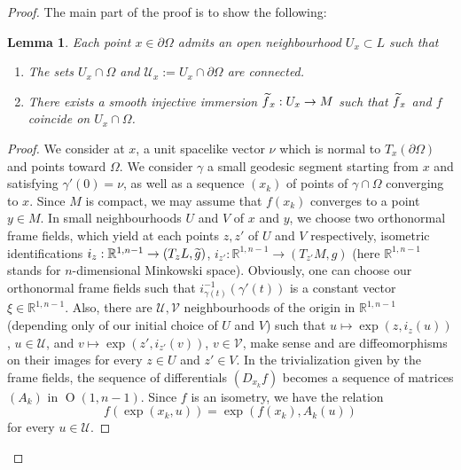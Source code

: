\documentclass[11pt]{article}
\newtheorem{lemm}[theo]{Lemma}
\theoremstyle{definition}
\numberwithin{equation}{section}
\numberwithin{figure}{section}
\numberwithin{table}{section}
\DeclareMathOperator{\Omp}{O}%
\newcommand*\RR{\mathbb{R}}
\let\oldtilde\tilde
\renewcommand*\tilde[1]{\mathchoice{\widetilde{#1}}{\widetilde{#1}}{\widetilde{#1}}{\oldtilde{#1}}}
\begin{document}
\begin{proof}
The main part of the proof is to show the following:

\begin{lemm}\label{lem.extension.locale}
Each point $x \in \partial \Omega$ admits an open neighbourhood $U_x \subset L$ such that
\begin{enumerate}
\item \label{5.9.1}The sets $U_x \cap \Omega$ and ${\mathcal U}_x:=U_x \cap \partial \Omega$ are connected.
\item \label{5.9.2}There exists a smooth injective immersion $\tilde{f}_x: U_x \to M$ such that $\tilde{f}_x$ and $f$ coincide on $U_x \cap \Omega$.
\end{enumerate}
\end{lemm}

\begin{proof}
We consider at $x$, a unit spacelike vector $\nu$ which is normal to $T_x(\partial \Omega)$ and points toward $\Omega$. We consider $\gamma$ a small geodesic segment starting from $x$ and satisfying $\gamma'(0)=\nu$, as well as a sequence $(x_k)$ of points of $\gamma \cap \Omega$ converging to $x$. Since $M$ is compact, we may assume that $f(x_k)$ converges to a point $y \in M$. In small neighbourhoods $U$ and $V$ of $x$ and $y$, we choose two orthonormal frame fields, which yield at each points $z,z'$ of $U$ and $V$ respectively, isometric identifications $i_z: \RR^{1,n-1} \to (T_zL,\tilde{g})$, $i_{z'}:\RR^{1,n-1} \to (T_{z'}M,g)$ (here $\RR^{1,n-1}$ stands for $n$-dimensional Minkowski space). Obviously, one can choose our orthonormal frame fields such that $i_{\gamma(t)}^{-1}(\gamma'(t))$ is a constant vector $\xi \in \RR^{1,n-1}$. Also, there are ${\mathcal U}, {\mathcal V}$ neighbourhoods of the origin in $\RR^{1,n-1}$ (depending only of our initial choice of $U$ and $V$) such that $u \mapsto \exp(z,i_z(u))$, $u \in {\mathcal U}$, and $v \mapsto \exp(z',i_{z'}(v))$, $v \in {\mathcal V}$, make sense and are diffeomorphisms on their images for every $z \in U$ and $z' \in V$. In the trivialization given by the frame fields, the sequence of differentials $(D_{x_k}f)$ becomes a sequence of matrices $(A_k)$ in $\Omp(1,n-1)$. Since $f$ is an isometry, we have the relation
\begin{equation}\label{eq.exponentielle}
f(\exp(x_k,u))=\exp(f(x_k),A_k(u))
\end{equation}
for every $u \in {\mathcal U}$.


\end{proof}
\end{proof}
\end{document}
